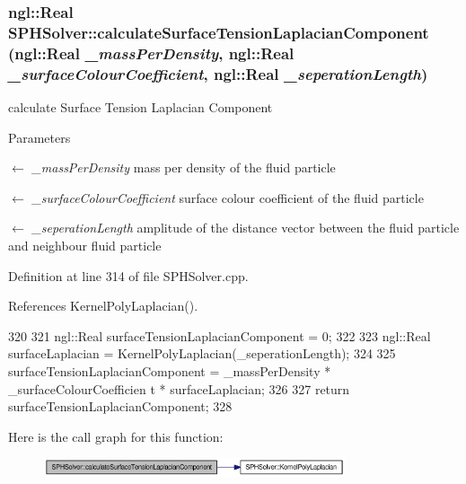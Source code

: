 \hypertarget{class_s_p_h_solver_abcc8f4b80a896833cdfb9f1ca71b28a2}{
\subsubsection[{calculateSurfaceTensionLaplacianComponent}]{\setlength{\rightskip}{0pt plus 5cm}ngl::Real SPHSolver::calculateSurfaceTensionLaplacianComponent (ngl::Real {\em \_\-massPerDensity}, \/  ngl::Real {\em \_\-surfaceColourCoefficient}, \/  ngl::Real {\em \_\-seperationLength})}}
\label{class_s_p_h_solver_abcc8f4b80a896833cdfb9f1ca71b28a2}


calculate Surface Tension Laplacian Component 


\begin{DoxyParams}{Parameters}
\item[\mbox{$\leftarrow$} {\em \_\-massPerDensity}]mass per density of the fluid particle \item[\mbox{$\leftarrow$} {\em \_\-surfaceColourCoefficient}]surface colour coefficient of the fluid particle \item[\mbox{$\leftarrow$} {\em \_\-seperationLength}]amplitude of the distance vector between the fluid particle and neighbour fluid particle \end{DoxyParams}


Definition at line 314 of file SPHSolver.cpp.



References KernelPolyLaplacian().




\begin{DoxyCode}
320 {
321     ngl::Real surfaceTensionLaplacianComponent = 0;
322 
323     ngl::Real surfaceLaplacian = KernelPolyLaplacian(_seperationLength);
324 
325     surfaceTensionLaplacianComponent = _massPerDensity * _surfaceColourCoefficien
      t * surfaceLaplacian;
326 
327     return surfaceTensionLaplacianComponent;
328 }
\end{DoxyCode}




Here is the call graph for this function:\nopagebreak
\begin{figure}[H]
\begin{center}
\leavevmode
\includegraphics[width=251pt]{class_s_p_h_solver_abcc8f4b80a896833cdfb9f1ca71b28a2_cgraph}
\end{center}
\end{figure}


